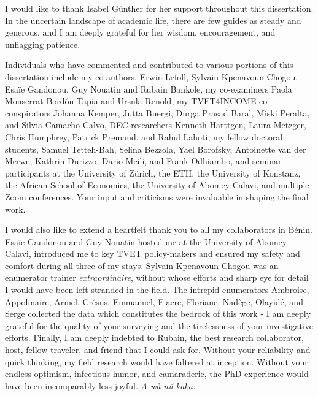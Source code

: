 I would like to thank Isabel Günther for her support throughout this dissertation. In the uncertain landscape of academic life, there are few guides as steady and generous, and I am deeply grateful for her wisdom, encouragement, and unflagging patience.

Individuals who have commented and contributed to various portions of this dissertation include my co-authors, Erwin Lefoll, Sylvain Kpenavoun Chogou, Esaïe Gandonou, Guy Nouatin and Rubain Bankole, my co-examiners Paola Monserrat Bordón Tapia and Ursula Renold, my TVET4INCOME co-conspirators Johanna Kemper, Jutta Buergi, Durga Prasad Baral, Miski Peralta, and Silvia Camacho Calvo, DEC researchers Kenneth Harttgen, Laura Metzger, Chris Humphrey, Patrick Premand, and Rahul Lahoti, my fellow doctoral students, Samuel Tetteh-Bah, Selina Bezzola, Yael Borofsky, Antoinette van der Merwe, Kathrin Durizzo, Dario Meili, and Frank Odhiambo, and seminar participants at the University of Zürich, the ETH, the University of Konstanz, the African School of Economics, the University of Abomey-Calavi, and multiple Zoom conferences. Your input and criticisms were invaluable in shaping the final work.

I would also like to extend a heartfelt thank you to all my collaborators in Bénin. Esaïe Gandonou and Guy Nouatin hosted me at the University of Abomey-Calavi, introduced me to key TVET policy-makers and ensured my safety and comfort during all three of my stays. Sylvain Kpenavoun Chogou was an enumerator trainer \textit{extraordinaire}, without whose efforts and sharp eye for detail I would have been left stranded in the field. The intrepid enumerators Ambroise, Appolinaire, Armel, Crésus, Emmanuel, Fiacre, Floriane, Nadège, Olayidé, and Serge collected the data which constitutes the bedrock of this work - I am deeply grateful for the quality of your surveying and the tirelessness of your investigative efforts. Finally, I am deeply indebted to Rubain, the best research collaborator, host, fellow traveler, and friend that I could ask for. Without your reliability and quick thinking, my field research would have faltered at inception. Without your endless optimism, infectious humor, and camaraderie, the PhD experience would have been incomparably less joyful. \textit{A wà nŭ kaka.}


